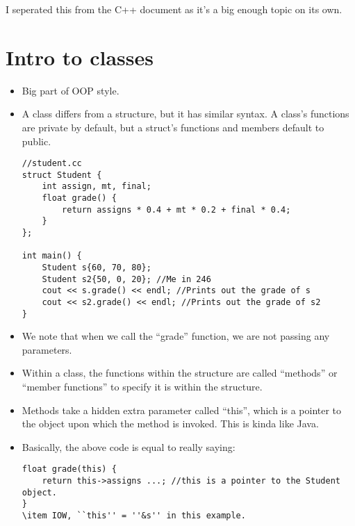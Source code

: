 \documentclass{article}
\author{Clement Tsang}
\begin{document}
I seperated this from the C++ document as it's a big enough topic on its own.

\section{Intro to classes}
\begin{itemize}
\item Big part of OOP style.
\item A class differs from a structure, but it has similar syntax.  A class's functions are private by default, but a struct's functions and members default to public.
\begin{lstlisting}
//student.cc
struct Student {
    int assign, mt, final;
    float grade() {
        return assigns * 0.4 + mt * 0.2 + final * 0.4;
    }
};

int main() {
    Student s{60, 70, 80};
    Student s2{50, 0, 20}; //Me in 246
    cout << s.grade() << endl; //Prints out the grade of s
    cout << s2.grade() << endl; //Prints out the grade of s2
}
\end{lstlisting}
\item We note that when we call the ``grade'' function, we are not passing any parameters.  
\item Within a class, the functions within the structure are called ``methods'' or ``member functions'' to specify it is within the structure.
\item Methods take a hidden extra parameter called ``this'', which is a pointer to the object upon which the method is invoked.  This is kinda like Java.
\item Basically, the above code is equal to really saying:
\begin{lstlisting}
float grade(this) {
    return this->assigns ...; //this is a pointer to the Student object.
}
\item IOW, ``this'' = ''&s'' in this example.
\end{lstlisting}
\end{itemize}
\end{document}

